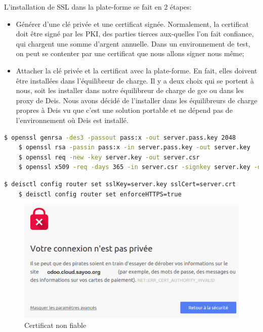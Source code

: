 \begin{onehalfspace}
L'installation de SSL dans la plate-forme se fait en 2 étapes:
\begin{itemize}
	\item Générer d'une clé privée et une certificat signée. Normalement, la certificat doit être signé par les PKI, des parties tierces aux-quelles l'on fait confiance, qui chargent une somme d'argent annuelle. Dans un environnement de test, on peut se contenter par une certificat que nous allons signer nous même;
	\item Attacher la clé privée et la certificat avec la plate-forme. En fait, elles doivent être installées dans l'équilibreur de charge. Il y a deux choix qui se portent à nous, soit les installer dans notre équilibreur de charge de \acrshort{gce} ou dans les proxy de Deis. Nous avons décidé de l'installer dans les équilibreurs de charge propres à Deis vu que c'est une solution portable et ne dépend pas de l'environnement où Deis est installé.
\end{itemize}

\begin{lstlisting}[language=bash,caption=Génération de la clé privée et la certificat]
	$ openssl genrsa -des3 -passout pass:x -out server.pass.key 2048
	$ openssl rsa -passin pass:x -in server.pass.key -out server.key
	$ openssl req -new -key server.key -out server.csr
	$ openssl x509 -req -days 365 -in server.csr -signkey server.key -out server.crt
\end{lstlisting}

\begin{lstlisting}[language=bash,caption=Activation du protocole SSL]
	$ deisctl config router set sslKey=server.key sslCert=server.crt
	$ deisctl config router set enforceHTTPS=true
\end{lstlisting}

\begin{figure}[H]
\centering
\includegraphics [scale=0.5]{chapitre5/assets/certificat}
\caption{Certificat non fiable}
\label{fig:certificat}
\end{figure}


\end{onehalfspace}

